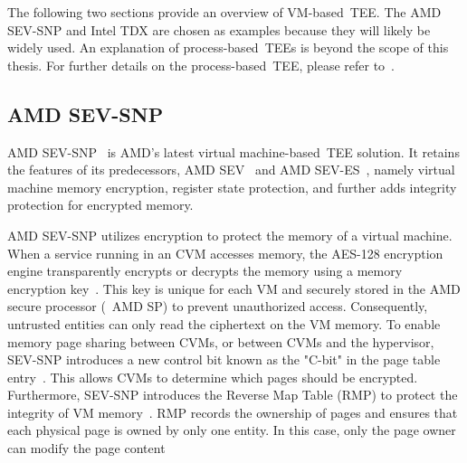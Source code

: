 The following two sections provide an overview of VM-based~\acrshort{TEE}. The AMD SEV-SNP and Intel TDX are chosen as examples because they will likely be widely used. An explanation of process-based~\acrshort{TEE}s is beyond the scope of this thesis. For further details on the process-based~\acrshort{TEE}, 
please refer to~\cite*{cryptoeprint:2016/086, 10.1145/2487726.2488370}.


\subsection{AMD SEV-SNP}

AMD SEV-SNP~\cite*{SEV_SNP_white_book} is AMD's latest virtual machine-based~\acrshort{TEE} solution. It retains the features of its predecessors, AMD SEV~\cite*{sev} and AMD SEV-ES~\cite*{sev_es}, namely virtual machine memory encryption, register state protection, and further adds integrity protection for 
encrypted memory.


AMD SEV-SNP utilizes encryption to protect the memory of a virtual machine. When a service running in an \acrshort{CVM} accesses memory, the AES-128 encryption engine transparently encrypts or decrypts the memory using a memory encryption key~\cite*{snp_Explained}.  This key is unique for each 
VM and securely stored in the AMD secure processor (~\acrshort{AMD SP}) to prevent unauthorized access. Consequently, untrusted entities can only read the ciphertext on the VM memory. To enable memory page sharing between \acrshort{CVM}s, or between \acrshort{CVM}s and the hypervisor, SEV-SNP introduces a new 
control bit known as the "C-bit" in the page table entry~\cite*{SEV_SNP_white_book}. This allows \acrshort{CVM}s to determine which pages should be encrypted. Furthermore, SEV-SNP introduces the Reverse Map Table (RMP) to protect the integrity of VM memory~\cite*{SEV_SNP_white_book}. 
RMP records the ownership of pages and ensures that each physical page is owned by only one entity. In this case, only the page owner can modify the page content



